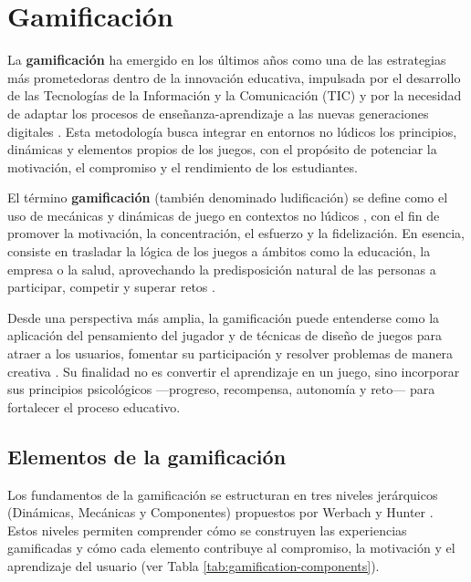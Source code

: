 \section{Gamificación}

La \textbf{gamificación} ha emergido en los últimos años como una de las estrategias más prometedoras dentro de la innovación educativa, impulsada por el desarrollo de las Tecnologías de la Información y la Comunicación (TIC) y por la necesidad de adaptar los procesos de enseñanza-aprendizaje a las nuevas generaciones digitales \cite{ortiz-colon_gamificacion_2018, gallego_panoramica_nodate, jaramillo-mediavilla_impact_2024}.  
Esta metodología busca integrar en entornos no lúdicos los principios, dinámicas y elementos propios de los juegos, con el propósito de potenciar la motivación, el compromiso y el rendimiento de los estudiantes.

El término \textbf{gamificación} (también denominado ludificación) se define como el uso de mecánicas y dinámicas de juego en contextos no lúdicos \cite{ortiz-colon_gamificacion_2018}, con el fin de promover la motivación, la concentración, el esfuerzo y la fidelización.  
En esencia, consiste en trasladar la lógica de los juegos a ámbitos como la educación, la empresa o la salud, aprovechando la predisposición natural de las personas a participar, competir y superar retos \cite{gallego_panoramica_nodate}.

Desde una perspectiva más amplia, la gamificación puede entenderse como la aplicación del pensamiento del jugador y de técnicas de diseño de juegos para atraer a los usuarios, fomentar su participación y resolver problemas de manera creativa \cite{jaramillo-mediavilla_impact_2024}.  
Su finalidad no es convertir el aprendizaje en un juego, sino incorporar sus principios psicológicos —progreso, recompensa, autonomía y reto— para fortalecer el proceso educativo.

\subsection{Elementos de la gamificación}

Los fundamentos de la gamificación se estructuran en tres niveles jerárquicos (Dinámicas, Mecánicas y Componentes) propuestos por Werbach y Hunter \cite{ortiz-colon_gamificacion_2018,morales_elearning_noda}.  
Estos niveles permiten comprender cómo se construyen las experiencias gamificadas y cómo cada elemento contribuye al compromiso, la motivación y el aprendizaje del usuario (ver Tabla \ref{tab:gamification-components}).

